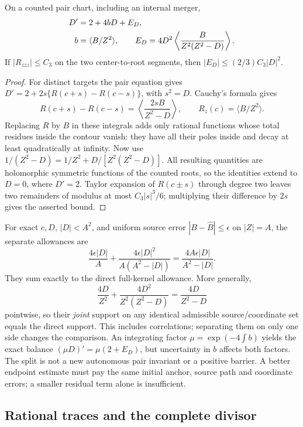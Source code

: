 \begin{proposition}\label{pair:affine-flux}
On a counted pair chart, including an internal merger,
\begin{align}
 D'&=2+4bD+E_D,\notag\\
 b&=\langle B/Z^2\rangle,\qquad
 E_D=4D^2\left\langle\frac{B}{Z^2(Z^2-D)}\right\rangle.
 \label{pair:affine-law}
\end{align}
If $|R_{zzz}|\le C_3$ on the two center-to-root segments, then
$|E_D|\le(2/3)C_3|D|^2$.
\end{proposition}
\begin{proof}
For distinct targets the pair equation gives
$D'=2+2s\{R(c+s)-R(c-s)\}$, with $s^2=D$.
Cauchy's formula gives
\[
 R(c+s)-R(c-s)
 =\left\langle\frac{2sB}{Z^2-D}\right\rangle,
 \qquad R_z(c)=\langle B/Z^2\rangle.
\]
Replacing $R$ by $B$ in these integrals adds only rational functions
whose total residues inside the contour vanish: they have all their
poles inside and decay at least quadratically at infinity. Now use
$1/(Z^2-D)=1/Z^2+D/[Z^2(Z^2-D)]$.
All resulting quantities are holomorphic symmetric functions of the
counted roots, so the identities extend to $D=0$, where $D'=2$.
Taylor expansion of $R(c\pm s)$ through degree two leaves two
remainders of modulus at most $C_3|s|^3/6$; multiplying their
difference by $2s$ gives the asserted bound.
\end{proof}

For exact $c,D$, $|D|<A^2$, and uniform source error
$|B-\widehat B|\le\epsilon$ on $|Z|=A$, the separate allowances are
\[
 \frac{4\epsilon|D|}{A}
 +\frac{4\epsilon|D|^2}{A(A^2-|D|)}
 =\frac{4A\epsilon|D|}{A^2-|D|}.
\]
They sum exactly to the direct full-kernel allowance. More generally,
\begin{equation}
 \frac{4D}{Z^2}+\frac{4D^2}{Z^2(Z^2-D)}
       =\frac{4D}{Z^2-D}
 \label{pair:joint-kernel}
\end{equation}
pointwise, so their \emph{joint} support on any identical admissible
source/coordinate set equals the direct support. This includes
correlations; separating them on only one side changes the comparison.
An integrating factor $\mu=\exp(-4\int b)$ yields the exact balance
$(\mu D)'=\mu(2+E_D)$, but uncertainty in $b$ affects both factors.
The split is not a new autonomous pair invariant or a positive barrier.
A better endpoint estimate must pay the same initial anchor, source
path and coordinate errors; a smaller residual term alone is insufficient.

\subsection{Rational traces and the complete divisor}

